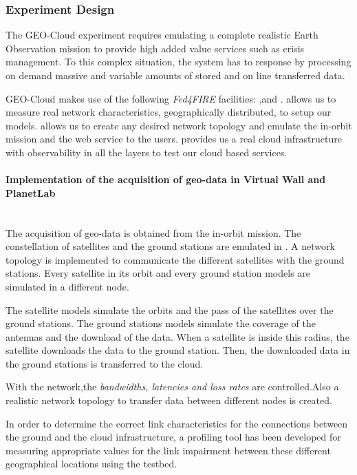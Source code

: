 \subsubsection{Experiment Design}


The GEO-Cloud experiment requires emulating a complete realistic Earth Observation mission to provide high added value services such as crisis management. To this complex situation, the system has to response by processing on demand massive and variable amounts of stored and on line transferred data.

GEO-Cloud makes use of the following \emph{Fed4FIRE} facilities: \pl,\vw and
\bonfire. \pl allows us to measure real network characteristics, geographically
distributed, to setup our models. \vw allows us to create any desired network
topology and emulate the in-orbit mission and the web service to the
users. \bonfire provides us a real cloud infrastructure with observability in
all the layers to test our cloud based services.


\paragraph{Implementation of the acquisition of geo-data in Virtual Wall and
  PlanetLab}~\\
The acquisition of geo-data is obtained from the in-orbit mission. The
constellation of satellites and the ground stations are emulated in \vw. A
network topology is implemented to communicate the different satellites with the
ground stations. Every satellite in its orbit and every ground station models
are simulated in a different node.

The satellite models simulate the orbits and the pass of the satellites over the
ground stations. The ground stations models simulate the coverage of the
antennas and the download of the data. When a satellite is inside this radius,
the satellite downloads the data to the ground station. Then, the downloaded data in the ground stations is transferred to the \bonfire cloud.

With the \vw network,the \emph{bandwidths, latencies and loss rates} are
controlled.Also a realistic network topology to transfer data between different
nodes is created.

In order to determine the correct link characteristics for the connections
between the ground and the cloud infrastructure, a profiling tool has been
developed for measuring appropriate values for the link impairment between these different geographical locations using the \pl testbed.


